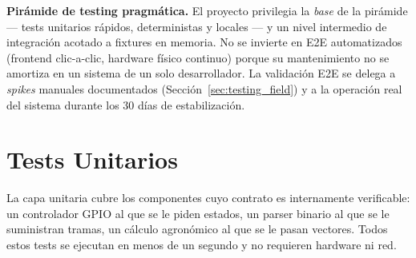 \begin{designnote}
\textbf{Pirámide de testing pragmática.} El proyecto privilegia la \textit{base} de la
pirámide — tests unitarios rápidos, deterministas y locales — y un nivel intermedio de
integración acotado a fixtures en memoria. No se invierte en E2E automatizados (frontend
clic-a-clic, hardware físico continuo) porque su mantenimiento no se amortiza en un
sistema de un solo desarrollador. La validación E2E se delega a \textit{spikes}
manuales documentados (Sección~\ref{sec:testing_field}) y a la operación real del
sistema durante los 30 días de estabilización.
\end{designnote}

\section{Tests Unitarios}
\label{sec:testing_unit}

La capa unitaria cubre los componentes cuyo contrato es internamente verificable: un
controlador GPIO al que se le piden estados, un parser binario al que se le suministran
tramas, un cálculo agronómico al que se le pasan vectores. Todos estos tests se
ejecutan en menos de un segundo y no requieren hardware ni red.

